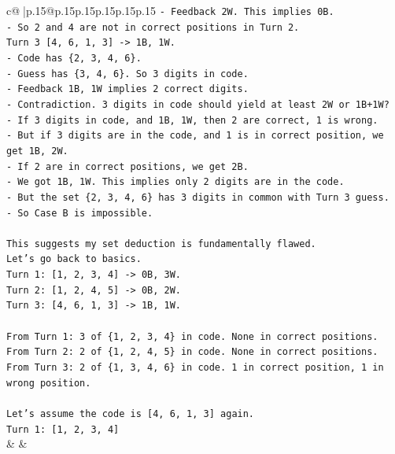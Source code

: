 \documentclass{article}
\begin{document}
{\begin{supertabular}{c@{$\;$}|p{.15\linewidth}@{}p{.15\linewidth}p{.15\linewidth}p{.15\linewidth}p{.15\linewidth}p{.15\linewidth}}
{{{\texttt{{-} Feedback 2W. This implies 0B.} \\
\texttt{{-} So 2 and 4 are not in correct positions in Turn 2.} \\
\texttt{Turn 3 {[}4, 6, 1, 3{]} {-}> 1B, 1W.} \\
\texttt{{-} Code has \{2, 3, 4, 6\}.} \\
\texttt{{-} Guess has \{3, 4, 6\}. So 3 digits in code.} \\
\texttt{{-} Feedback 1B, 1W implies 2 correct digits.} \\
\texttt{{-} Contradiction. 3 digits in code should yield at least 2W or 1B+1W?} \\
\texttt{{-} If 3 digits in code, and 1B, 1W, then 2 are correct, 1 is wrong.} \\
\texttt{{-} But if 3 digits are in the code, and 1 is in correct position, we get 1B, 2W.} \\
\texttt{{-} If 2 are in correct positions, we get 2B.} \\
\texttt{{-} We got 1B, 1W. This implies only 2 digits are in the code.} \\
\texttt{{-} But the set \{2, 3, 4, 6\} has 3 digits in common with Turn 3 guess.} \\
\texttt{{-} So Case B is impossible.} \\
\\ 
\texttt{This suggests my set deduction is fundamentally flawed.} \\
\texttt{Let's go back to basics.} \\
\texttt{Turn 1: {[}1, 2, 3, 4{]} {-}> 0B, 3W.} \\
\texttt{Turn 2: {[}1, 2, 4, 5{]} {-}> 0B, 2W.} \\
\texttt{Turn 3: {[}4, 6, 1, 3{]} {-}> 1B, 1W.} \\
\\ 
\texttt{From Turn 1: 3 of \{1, 2, 3, 4\} in code. None in correct positions.} \\
\texttt{From Turn 2: 2 of \{1, 2, 4, 5\} in code. None in correct positions.} \\
\texttt{From Turn 3: 2 of \{1, 3, 4, 6\} in code. 1 in correct position, 1 in wrong position.} \\
\\ 
\texttt{Let's assume the code is {[}4, 6, 1, 3{]} again.} \\
\texttt{Turn 1: {[}1, 2, 3, 4{]}} \\
            }
        }
    }
    & & \\ \\


\end{supertabular}}
\end{document}
